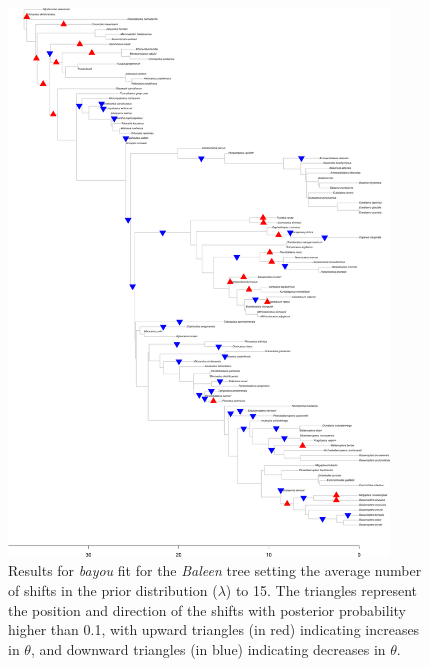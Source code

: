 \begin{figure}[H]
\includegraphics[width=0.9\textwidth]{img/plots-baleen-wZBL-k15-1.pdf}
\caption{Results for \textit{bayou} fit for the \textit{Baleen} tree setting the average number of shifts in the prior distribution ($\lambda$) to 15. The triangles represent the position and direction of the shifts with posterior probability higher than 0.1, with upward triangles (in red) indicating increases in $\theta$, and downward triangles (in blue) indicating decreases in $\theta$.}
\label{fig:baleen-k15}
\end{figure}

\newpage

